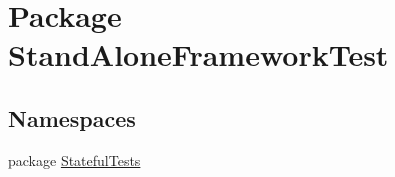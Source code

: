 \hypertarget{namespace_stand_alone_framework_test}{\section{Package Stand\+Alone\+Framework\+Test}
\label{namespace_stand_alone_framework_test}
}
\subsection*{Namespaces}
\begin{DoxyCompactItemize}
\item 
package \hyperlink{namespace_stand_alone_framework_test_1_1_stateful_tests}{Stateful\+Tests}
\end{DoxyCompactItemize}

